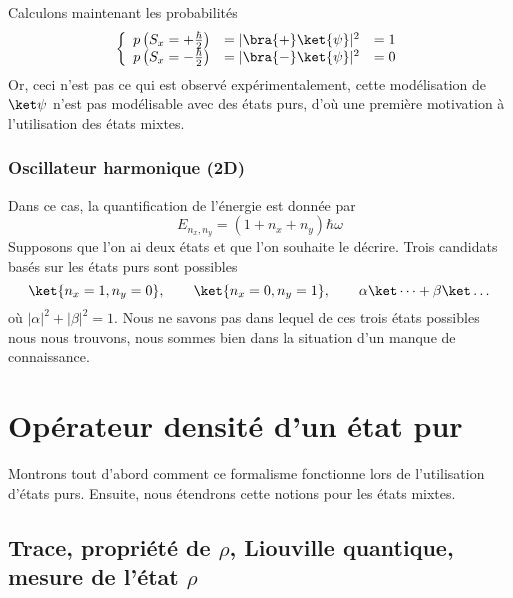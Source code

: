 Calculons maintenant les probabilités
\begin{equation}
\left\{\begin{array}{lll}
p\left( S_x = +\frac{\hbar}{2}\right) &= |\bra{+}\ket{\psi}|^2 &= 1\\
p\left( S_x = -\frac{\hbar}{2}\right) &= |\bra{-}\ket{\psi}|^2 &= 0
\end{array}\right.
\end{equation}
Or, ceci n'est pas ce qui est observé expérimentalement, cette modélisation de $\ket\psi$ n'est pas 
modélisable avec des états purs, d'où une première motivation à l'utilisation des états mixtes.\\

\subsubsection{Oscillateur harmonique (2D)}
Dans ce cas, la quantification de l'énergie est donnée par
\begin{equation}
E_{n_x, n_y} = (1+n_x+n_y)\hbar\omega
\end{equation}
Supposons que l'on ai deux états et que l'on souhaite le décrire. Trois candidats basés sur les états 
purs sont possibles
\begin{equation}
\ket{n_x=1,n_y=0},\qquad\ket{n_x=0,n_y=1},\qquad \alpha\ket\dots + \beta\ket\dots
\end{equation}
où $|\alpha|^2+|\beta|^2 = 1$. Nous ne savons pas dans lequel de ces trois états possibles nous nous 
trouvons, nous sommes bien dans la situation d'un manque de connaissance.


\section{Opérateur densité d'un état pur}
Montrons tout d'abord comment ce formalisme fonctionne lors de l'utilisation d'états purs. Ensuite, 
nous étendrons cette notions pour les états mixtes.

\subsection{Trace, propriété de $\rho$, Liouville quantique, mesure de l'état $\rho$}

